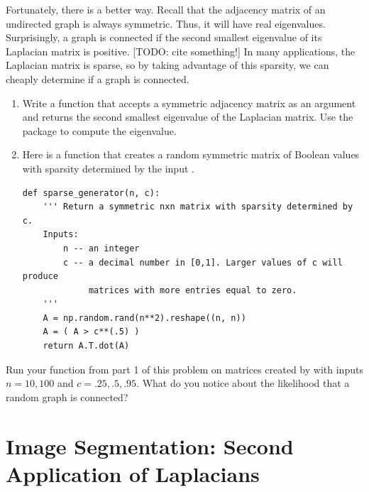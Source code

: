 Fortunately, there is a better way.
Recall that the adjacency matrix of an undirected graph is always symmetric. 
Thus, it will have real eigenvalues. 
Surprisingly, a graph is connected if the second smallest eigenvalue of its Laplacian matrix is positive. [TODO: cite something!]
In many applications, the Laplacian matrix is sparse, so by taking advantage of this sparsity, we can cheaply determine if a graph is connected.

\begin{problem}
\leavevmode
\begin{enumerate}
\item Write a function that accepts a symmetric adjacency matrix as an argument and returns the second smallest eigenvalue of the Laplacian matrix.
Use the  package to compute the eigenvalue.

\item Here is a function that creates a random symmetric matrix of Boolean values with sparsity determined by the input .
\begin{lstlisting}
def sparse_generator(n, c):
    ''' Return a symmetric nxn matrix with sparsity determined by c.
    Inputs:
        n -- an integer
        c -- a decimal number in [0,1]. Larger values of c will produce
             matrices with more entries equal to zero.
    '''
    A = np.random.rand(n**2).reshape((n, n))
    A = ( A > c**(.5) )
    return A.T.dot(A)
\end{lstlisting}
\end{enumerate}

Run your function from part 1 of this problem on matrices created by  with inputs $n = 10, 100$ and $c = .25, .5, .95$. 
What do you notice about the likelihood that a random graph is connected?
\end{problem}


\section*{Image Segmentation: Second Application of Laplacians}

